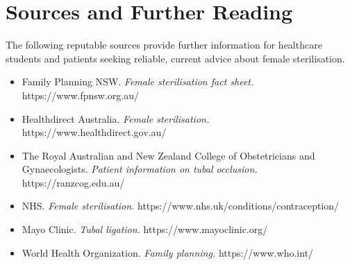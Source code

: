 \section*{Sources and Further Reading}
The following reputable sources provide further information for healthcare students and patients seeking reliable, current advice about female sterilisation.
\begin{itemize}
    \item Family Planning NSW. \textit{Female sterilisation fact sheet.} https://www.fpnsw.org.au/
    \item Healthdirect Australia. \textit{Female sterilisation.} https://www.healthdirect.gov.au/
    \item The Royal Australian and New Zealand College of Obstetricians and Gynaecologists. \textit{Patient information on tubal occlusion.} https://ranzcog.edu.au/
    \item NHS. \textit{Female sterilisation.} https://www.nhs.uk/conditions/contraception/
    \item Mayo Clinic. \textit{Tubal ligation.} https://www.mayoclinic.org/
    \item World Health Organization. \textit{Family planning.} https://www.who.int/
\end{itemize}
